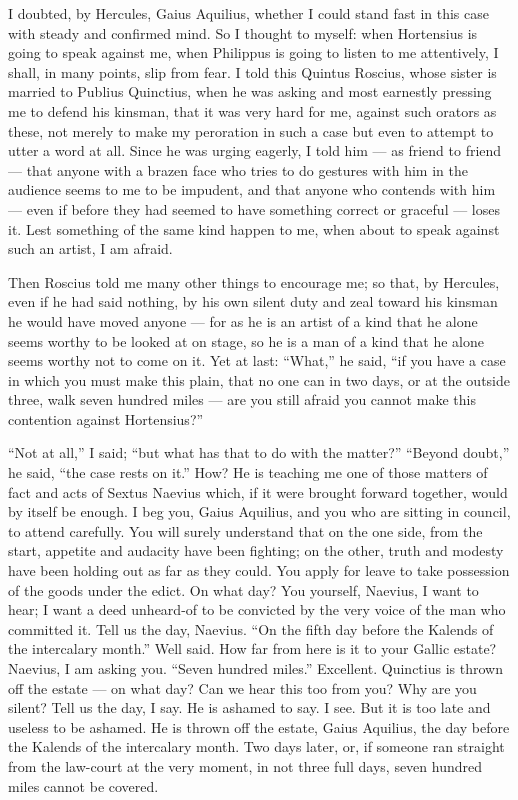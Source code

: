  I doubted, by Hercules, Gaius Aquilius, whether I could stand fast in this case with steady and confirmed mind. So I thought to myself: when Hortensius is going to speak against me, when Philippus is going to listen to me attentively, I shall, in many points, slip from fear. I told this Quintus Roscius, whose sister is married to Publius Quinctius, when he was asking and most earnestly pressing me to defend his kinsman, that it was very hard for me, against such orators as these, not merely to make my peroration in such a case but even to attempt to utter a word at all. Since he was urging eagerly, I told him --- as friend to friend --- that anyone with a brazen face who tries to do gestures with him in the audience seems to me to be impudent, and that anyone who contends with him --- even if before they had seemed to have something correct or graceful --- loses it. Lest something of the same kind happen to me, when about to speak against such an artist, I am afraid.

 Then Roscius told me many other things to encourage me; so that, by Hercules, even if he had said nothing, by his own silent duty and zeal toward his kinsman he would have moved anyone --- for as he is an artist of a kind that he alone seems worthy to be looked at on stage, so he is a man of a kind that he alone seems worthy not to come on it. Yet at last: ``What,'' he said, ``if you have a case in which you must make this plain, that no one can in two days, or at the outside three, walk seven hundred miles --- are you still afraid you cannot make this contention against Hortensius?''

 ``Not at all,'' I said; ``but what has that to do with the matter?'' ``Beyond doubt,'' he said, ``the case rests on it.'' How? He is teaching me one of those matters of fact and acts of Sextus Naevius which, if it were brought forward together, would by itself be enough. I beg you, Gaius Aquilius, and you who are sitting in council, to attend carefully. You will surely understand that on the one side, from the start, appetite and audacity have been fighting; on the other, truth and modesty have been holding out as far as they could. You apply for leave to take possession of the goods under the edict. On what day? You yourself, Naevius, I want to hear; I want a deed unheard-of to be convicted by the very voice of the man who committed it. Tell us the day, Naevius. ``On the fifth day before the Kalends of the intercalary month.'' Well said. How far from here is it to your Gallic estate? Naevius, I am asking you. ``Seven hundred miles.'' Excellent. Quinctius is thrown off the estate --- on what day? Can we hear this too from you? Why are you silent? Tell us the day, I say. He is ashamed to say. I see. But it is too late and useless to be ashamed. He is thrown off the estate, Gaius Aquilius, the day before the Kalends of the intercalary month. Two days later, or, if someone ran straight from the law-court at the very moment, in not three full days, seven hundred miles cannot be covered.

